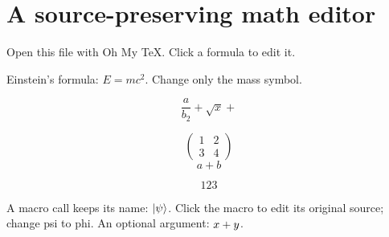 \documentclass{article}
\begin{document}
\section{A source-preserving math editor}
Open this file with Oh My TeX. Click a formula to edit it.

Einstein's formula: $ E  = m c^{2} $. Change only the mass symbol.

\[
  \frac{ a %
  }{ b_2 } + \sqrt{x}+
\]

$$
\begin{pmatrix}
    1 & 2\\
    3 & 4
\end{pmatrix}
$$
\begin{equation}
  a+b
\end{equation}

$$
123
$$

A macro call keeps its name: $\left|\psi\right\rangle$.
Click the macro to edit its original source; change psi to phi.
An optional argument: $x+y$.


\end{document}

